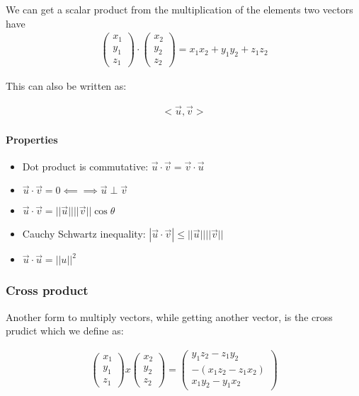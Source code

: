 \documentclass[11pt,fleqn]{book} %
\begin{document}
We can get a scalar product from the multiplication of the elements two vectors have
\begin{gather*}
    \begin{pmatrix}
        x_1 \\ y_1 \\ z_1
    \end{pmatrix}
    \cdot
    \begin{pmatrix}
        x_2 \\ y_2 \\ z_2
    \end{pmatrix} = x_1 x_2 + y_1 y_2 + z_1 z_2
\end{gather*}

This can also be written as:

\begin{gather}
    <\vec{u}, \vec{v}>
\end{gather}

\paragraph{Properties}

\begin{itemize}
    \item Dot product is commutative: $\vec{u} \cdot \vec{v} = \vec{v} \cdot \vec{u}$ 
    \item $\vec{u} \cdot \vec{v} = 0 \impliedby \implies \vec{u} \perp \vec{v}$
    \item $\vec{u} \cdot \vec{v} = ||\vec{u}|| ||\vec{v}|| \cos{\theta}$
    \item Cauchy Schwartz inequality: $|\vec{u}\cdot\vec{v}| \leq ||\vec{u}|| ||\vec{v}||$
    \item $\vec{u} \cdot \vec{u} = ||u||^2$
\end{itemize}

\subsubsection{Cross product}

Another form to multiply vectors, while getting another vector, is the cross prudict which we define as:

\begin{gather*}
    \begin{pmatrix}
        x_1 \\ y_1 \\ z_1
    \end{pmatrix}
    x
    \begin{pmatrix}
        x_2 \\ y_2 \\ z_2
    \end{pmatrix} = \begin{pmatrix}
        y_1 z_2 -z_1 y_2 \\ - (x_1 z_2 - z_1 x_2) \\ x_1 y_2 - y_1 x_2
    \end{pmatrix}
\end{gather*}
\end{document}
